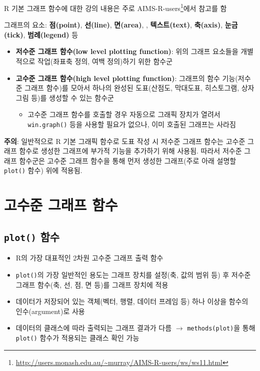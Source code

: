 \documentclass[
  11pt,
]{krantz}
\providecommand{\tightlist}{%
  \setlength{\itemsep}{0pt}\setlength{\parskip}{0pt}}
\renewcommand{\href}[2]{#2\footnote{\url{#1}}}
\let\BeginKnitrBlock\begin \let\EndKnitrBlock\end
\begin{document}
\footnotesize

\BeginKnitrBlock{rmdnote}
R 기본 그래프 함수에 대한 강의 내용은 주로 \href{http://users.monash.edu.au/~murray/AIMS-R-users/ws/ws11.html}{AIMS-R-users}에서 참고를 함
\EndKnitrBlock{rmdnote}

\normalsize

그래프의 요소: \textbf{점(point)}, \textbf{선(line)}, \textbf{면(area)}, , \textbf{텍스트(text)}, \textbf{축(axis)}, \textbf{눈금(tick)}, \textbf{범례(legend)} 등

\begin{itemize}
\tightlist
\item
  \textbf{저수준 그래프 함수(low level plotting function)}: 위의 그래프 요소들을 개별적으로 작업(좌표축 정의, 여백 정의)하기 위한 함수군
\item
  \textbf{고수준 그래프 함수(high level plotting function)}: 그래프의 함수 기능(저수준 그래프 함수)를 모아서 하나의 완성된 도표(산점도, 막대도표, 히스토그램, 상자그림 등)를 생성할 수 있는 함수군

  \begin{itemize}
  \tightlist
  \item
    고수준 그래프 함수를 호출할 경우 자동으로 그래픽 장치가 열려서 \texttt{win.graph()} 등을 사용할 필요가 없으나, 이미 호출된 그래프는 사라짐
  \end{itemize}
\end{itemize}

\footnotesize

\BeginKnitrBlock{rmdcaution}
\textbf{주의}: 일반적으로 R 기본 그래픽 함수로 도표 작성 시 저수준 그래프 함수는 고수준 그래프 함수로 생성한 그래프에 부가적 기능을 추가하기 위해 사용됨. 따라서 저수준 그래프 함수군은 고수준 그래프 함수을 통해 먼저 생성한 그래프(주로 아래 설명할 \texttt{plot()} 함수) 위에 적용됨.
\EndKnitrBlock{rmdcaution}

\normalsize

\hypertarget{high-level-graph}{%
\section{고수준 그래프 함수}\label{high-level-graph}}

\hypertarget{plot-fun}{%
\subsection{\texorpdfstring{\textbf{\texttt{plot()} 함수}}{plot() 함수}}\label{plot-fun}}

\begin{itemize}
\tightlist
\item
  R의 가장 대표적인 2차원 고수준 그래프 출력 함수
\item
  \texttt{plot()}의 가장 일반적인 용도는 그래프 장치를 설정(축, 값의 범위 등) 후 저수준 그래프 함수(축, 선, 점, 면 등)를 그래프 장치에 적용
\item
  데이터가 저장되어 있는 객체(벡터, 행렬, 데이터 프레임 등) 하나 이상을 함수의 인수(argument)로 사용
\item
  데이터의 클래스에 따라 출력되는 그래프 결과가 다름 \(\rightarrow\) \texttt{methods(plot)}을 통해 \texttt{plot()} 함수가 적용되는 클래스 확인 가능
\end{itemize}
\end{document}

